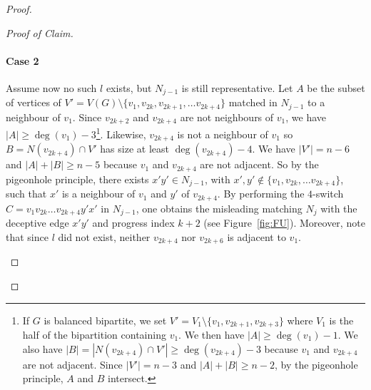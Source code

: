 \documentclass[11pt,a4paper]{article}
\theoremstyle{definition}
\newenvironment{poc}{\begin{proof}[Proof of
    Claim]\renewcommand*{\qedsymbol}{$\blacksquare$}}{\end{proof}}
\begin{document}
\begin{proof}
\begin{poc}
    \paragraph{Case 2}
    Assume now no such $l$ exists, but $N_{j-1}$ is still representative. Let
    $A$ be the subset of vertices of
    $V'=V(G) \setminus \{v_1, v_{2k}, v_{2k+1},\dots v_{2k+4}\}$ matched in
    $N_{j-1}$ to a neighbour of $v_1$. Since $v_{2k+2}$ and $v_{2k+4}$ are not
    neighbours of $v_1$, we have $|A| \ge \deg(v_1) - 3$\footnote{If $G$ is
      balanced bipartite, we set
      $V' = V_1 \setminus \{v_1, v_{2k+1}, v_{2k+3}\}$ where $V_1$ is the half
      of the bipartition containing $v_1$. We then have $|A| \ge
      \deg(v_1)-1$. We also have
      $|B| = |N(v_{2k+4}) \cap V'| \ge \deg(v_{2k+4}) -3$ because $v_1$ and
      $v_{2k+4}$ are not adjacent. Since $|V'| = n-3$ and $|A| + |B| \ge n-2$,
      by the pigeonhole principle, $A$ and $B$ intersect.}. Likewise, $v_{2k+4}$ is
    not a neighbour of $v_1$ so $B = N(v_{2k+4}) \cap V'$ has size at least
    $\deg(v_{2k+4})-4$.  We have $|V'| = n-6$ and $|A| + |B| \ge n-5$ because
    $v_1$ and $v_{2k+4}$ are not adjacent. So by the pigeonhole principle, there
    exists $x'y' \in N_{j-1}$, with
    $x', y' \notin \{v_1, v_{2k}, \dots v_{2k+4}\}$, such that $x'$ is a
    neighbour of $v_1$ and $y'$ of $v_{2k+4}$. By performing the $4$-switch
    $C= v_1v_{2k}\dots v_{2k+4}y'x'$ in $N_{j-1}$, one obtains the misleading
    matching $N_j$ with the deceptive edge $x'y'$ and progress index $k+2$ (see
    Figure~\ref{fig:FU}). Moreover, note that since $l$ did not exist, neither
    $v_{2k+4}$ nor $v_{2k+6}$ is adjacent to $v_1$.
    \begin{figure}[ht!]  
      \centering
      \begin{subfigure}[t]{.45\linewidth}
        \centering
\end{subfigure}
\end{figure}
\end{poc}
\end{proof}
\end{document}
